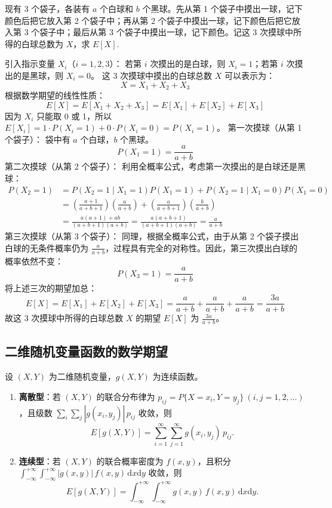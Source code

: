 ﻿\documentclass[lang=cn,11pt]{elegantbook}
\begin{document}
\begin{exercise}
现有 3 个袋子，各装有 $a$ 个白球和 $b$ 个黑球。先从第 1 个袋子中摸出一球，记下颜色后把它放入第 2 个袋子中；再从第 2 个袋子中摸出一球，记下颜色后把它放入第 3 个袋子中；最后从第 3 个袋子中摸出一球，记下颜色。记这 3 次摸球中所得的白球总数为 $X$，求 $E[X]$.
\end{exercise}
\begin{solution}
引入指示变量 $X_i$（$i = 1, 2, 3$）：
若第 $i$ 次摸出的是白球，则 $X_i = 1$；若第 $i$ 次摸出的是黑球，则 $X_i = 0$。
这 3 次摸球中摸出的白球总数 $X$ 可以表示为：
$$X = X_1 + X_2 + X_3$$
根据数学期望的线性性质：
$$E[X] = E[X_1 + X_2 + X_3] = E[X_1] + E[X_2] + E[X_3]$$
因为 $X_i$ 只能取 0 或 1，所以 $E[X_i] = 1 \cdot P(X_i = 1) + 0 \cdot P(X_i = 0) = P(X_i = 1)$。
第一次摸球（从第 1 个袋子）：
袋中有 $a$ 个白球，$b$ 个黑球。
$$P(X_1 = 1) = \frac{a}{a+b}$$
第二次摸球（从第 2 个袋子）：
利用全概率公式，考虑第一次摸出的是白球还是黑球：
\begin{align*}
P(X_2 = 1) &= P(X_2 = 1 \mid X_1 = 1)P(X_1 = 1) + P(X_2 = 1 \mid X_1 = 0)P(X_1 = 0) \\
&= \left(\frac{a+1}{a+b+1}\right)\left(\frac{a}{a+b}\right) + \left(\frac{a}{a+b+1}\right)\left(\frac{b}{a+b}\right) \\
&= \frac{a(a+1) + ab}{(a+b+1)(a+b)} = \frac{a(a+b+1)}{(a+b+1)(a+b)} = \frac{a}{a+b}
\end{align*}
第三次摸球（从第 3 个袋子）：
同理，根据全概率公式，由于从第 2 个袋子摸出白球的无条件概率仍为 $\frac{a}{a+b}$，过程具有完全的对称性。因此，第三次摸出白球的概率依然不变：
$$P(X_3 = 1) = \frac{a}{a+b}$$
将上述三次的期望加总：
$$E[X] = E[X_1] + E[X_2] + E[X_3] = \frac{a}{a+b} + \frac{a}{a+b} + \frac{a}{a+b} = \frac{3a}{a+b}$$
故这 3 次摸球中所得的白球总数 $X$ 的期望 $E[X]$ 为 $\frac{3a}{a+b}$。
\end{solution}


\subsection{二维随机变量函数的数学期望}

\begin{definition}[二维随机变量函数的期望] \label{def:2d-expectation}
设 \((X,Y)\) 为二维随机变量，\(g(X,Y)\) 为连续函数。
\begin{enumerate}
    \item \textbf{离散型}：若 \((X,Y)\) 的联合分布律为 \(p_{ij} = P\{X=x_i, Y=y_j\}\ (i,j=1,2,\dots)\)，且级数 \(\sum\limits_{i}\sum\limits_{j} |g(x_i,y_j)|\,p_{ij}\) 收敛，则
    \[
    E[g(X,Y)] = \sum_{i=1}^{\infty}\sum_{j=1}^{\infty} g(x_i, y_j)\,p_{ij}.
    \]
    \item \textbf{连续型}：若 \((X,Y)\) 的联合概率密度为 \(f(x,y)\)，且积分 \(\int_{-\infty}^{+\infty}\int_{-\infty}^{+\infty} |g(x,y)|\,f(x,y)\,\mathrm{d}x\mathrm{d}y\) 收敛，则
    \[
    E[g(X,Y)] = \int_{-\infty}^{+\infty}\int_{-\infty}^{+\infty} g(x,y)\,f(x,y)\,\mathrm{d}x\mathrm{d}y.
    \]
\end{enumerate}
\end{definition}
\end{document}
